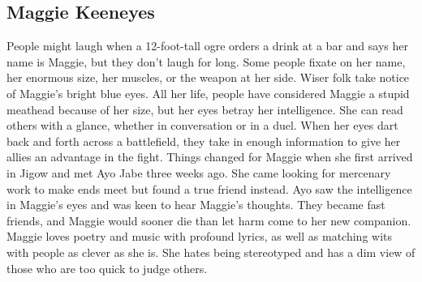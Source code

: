 \documentclass[10pt,a4paper,twoside,bg=print,twocolumn,openany,nodeprecatedcode]{dndbook}
\begin{document}
\subsection{Maggie Keeneyes}
People might laugh when a 12-foot-tall ogre orders a drink at a bar and says her name is Maggie, but they don't laugh for long. Some people fixate on her name, her enormous size, her muscles, or the weapon at her side. Wiser folk take notice of Maggie's bright blue eyes. All her life, people have considered Maggie a stupid meathead because of her size, but her eyes betray her intelligence. She can read others with a glance, whether in conversation or in a duel. When her eyes dart back and forth across a battlefield, they take in enough information to give her allies an advantage in the fight.
Things changed for Maggie when she first arrived in Jigow and met Ayo Jabe three weeks ago. She came looking for mercenary work to make ends meet but found a true friend instead. Ayo saw the intelligence in Maggie's eyes and was keen to hear Maggie's thoughts. They became fast friends, and Maggie would sooner die than let harm come to her new companion.
Maggie loves poetry and music with profound lyrics, as well as matching wits with people as clever as she is. She hates being stereotyped and has a dim view of those who are too quick to judge others.
\end{document}

